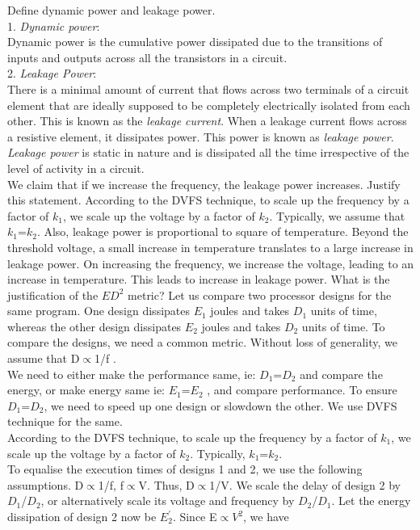 \begin{ExerciseList}
\Exercise
Define dynamic power and leakage power.
\Answer
\hspace{1mm} \\ 
1. \textit{Dynamic power}: \\
Dynamic power is the cumulative power dissipated due to the transitions of inputs and outputs across all the transistors in a circuit. \\
2. \textit{Leakage Power}: \\
There is a minimal amount of current that flows across two terminals of a circuit element that are ideally supposed to be completely electrically isolated from each other. This is known as the \textit{leakage current}. When a leakage current flows across a resistive element, it dissipates power. This power is known as \textit{leakage power}. \textit{Leakage power} is static in nature and is dissipated all the time irrespective of the level of activity in a circuit. \\
\Exercise[difficulty=1]
We claim that if we increase the frequency, the leakage power increases. Justify this statement.
\Answer
According to the DVFS technique, to scale up the frequency by a factor of $k_1$, we scale up the voltage by a factor of $k_2$. Typically, we assume that $k_1$=$k_2$. Also, leakage power is proportional to square of temperature. Beyond the threshold voltage, a small increase in temperature translates to a large increase in leakage power. On increasing the frequency, we increase the voltage, leading to an increase in temperature. This leads to increase in leakage power.
\Exercise
What is the justification of the $ED^2$ metric?
\Answer
Let us compare two processor designs for the same program. One design dissipates $E_1$ joules and takes $D_1$ units of time, whereas the other design dissipates $E_2$ joules and takes $D_2$ units of time. To compare the designs, we need a common metric. Without loss of generality, we assume that D$\propto$1/f . \\
We need to either make the performance same, ie: $D_1$=$D_2$ and compare the energy, or make energy same ie: $E_1$=$E_2$ , and compare performance. To ensure $D_1$=$D_2$, we need to speed up one design or slowdown the other. We use DVFS technique for the same. \\
According to the DVFS technique, to scale up the frequency by a factor of $k_1$, we scale up the voltage by a factor of $k_2$. Typically, $k_1$=$k_2$. \\
To equalise the execution times of designs 1 and 2, we use the following assumptions. D$\propto$1/f, f$\propto$V. Thus, D$\propto$1/V. We scale the delay of design 2 by $D_1$/$D_2$, or alternatively scale its voltage and frequency by $D_2$/$D_1$. Let the energy dissipation of design 2 now be $E_2^{'}$. Since E$\propto$$V^{2}$, we have \\
$$
\end{ExerciseList}
